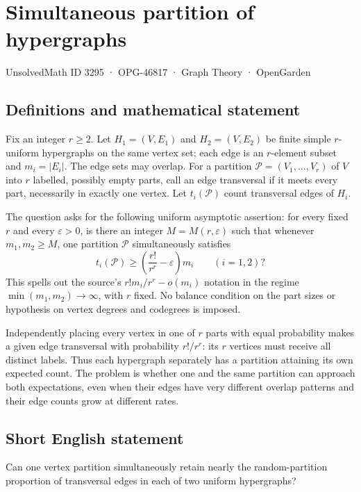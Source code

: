 \documentclass[11pt,a4paper]{article}
\begin{document}
\section*{Simultaneous partition of hypergraphs}\label{3295}
{\small UnsolvedMath ID 3295 · OPG-46817 · Graph Theory · OpenGarden}
\subsection{Definitions and mathematical statement}
Fix an integer $r\ge2$. Let $H_1=(V,E_1)$ and $H_2=(V,E_2)$ be finite
simple $r$-uniform hypergraphs on the same vertex set; each edge is an
$r$-element subset and $m_i=|E_i|$. The edge sets may overlap. For a
partition $\mathcal P=(V_1,\ldots,V_r)$ of $V$ into $r$ labelled,
possibly empty parts, call an edge transversal if it meets every
part, necessarily in exactly one vertex. Let $t_i(\mathcal P)$ count
transversal edges of $H_i$.

The question asks for the following uniform asymptotic assertion:
for every fixed $r$ and every $\varepsilon>0$, is there an integer
$M=M(r,\varepsilon)$ such that whenever $m_1,m_2\ge M$, one partition
$\mathcal P$ simultaneously satisfies
\[
             t_i(\mathcal P)\ge
             \left(\frac{r!}{r^r}-\varepsilon\right)m_i
                         \qquad(i=1,2)?
\]
This spells out the source's $r!m_i/r^r-o(m_i)$ notation in the regime
$\min(m_1,m_2)\to\infty$, with $r$ fixed. No balance condition on the
part sizes or hypothesis on vertex degrees and codegrees is imposed.

Independently placing every vertex in one of $r$ parts with equal
probability makes a given edge transversal with probability $r!/r^r$:
its $r$ vertices must receive all distinct labels. Thus each hypergraph
separately has a partition attaining its own expected count. The
problem is whether one and the same partition can approach both
expectations, even when their edges have very different overlap
patterns and their edge counts grow at different rates.
\subsection{Short English statement}
Can one vertex partition simultaneously retain nearly the random-partition proportion of transversal edges in each of two uniform hypergraphs?
\end{document}
